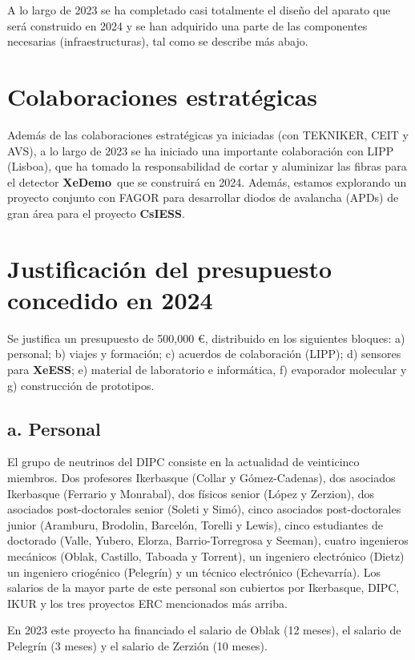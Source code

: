 \documentclass[12pt,a4paper,article]{report} %
\def\xess{{\bf XeESS}}
\def\cess{{\bf CsIESS}}
\def\xed{{\bf XeDemo}}
\begin{document}
A lo largo de 2023 se ha completado casi totalmente el diseño del aparato que será construido en 2024 y se han adquirido una parte de las componentes necesarias (infraestructuras), tal como se describe más abajo.  

\section*{Colaboraciones estratégicas}

Además de las colaboraciones estratégicas ya iniciadas (con TEKNIKER, CEIT y AVS), a lo largo de 2023 se ha iniciado una importante colaboración con LIPP (Lisboa), que ha tomado la responsabilidad de cortar y aluminizar las fibras para el detector \xed\ que se construirá en 2024. Además, estamos explorando un proyecto conjunto con FAGOR para  
desarrollar diodos de avalancha (APDs) de gran área para el proyecto \cess.  
 

\section*{Justificación del presupuesto concedido en 2024}

Se justifica un presupuesto de 500,000 \euro, distribuido en los siguientes bloques: a) personal; b) viajes y formación; c) acuerdos de colaboración (LIPP);  d) sensores para \xess; e) material de laboratorio e informática, f) evaporador molecular y g) construcción de prototipos. 

 \subsection*{a. Personal}
 
 El grupo de neutrinos del DIPC consiste en la actualidad de veinticinco miembros. Dos profesores Ikerbasque (Collar y Gómez-Cadenas), dos asociados Ikerbasque (Ferrario y Monrabal), dos físicos senior (López y Zerzion), dos asociados post-doctorales senior (Soleti y Simó), cinco asociados post-doctorales junior (Aramburu, Brodolin, Barcelón, Torelli y Lewis), cinco estudiantes de doctorado (Valle, Yubero, Elorza, Barrio-Torregrosa y Seeman), cuatro ingenieros mecánicos (Oblak, Castillo, Taboada y Torrent), un ingeniero electrónico (Dietz) un ingeniero criogénico (Pelegrín) y un técnico electrónico (Echevarría). Los salarios de la mayor parte de este personal son cubiertos por Ikerbasque, DIPC, IKUR y los tres proyectos ERC mencionados más arriba. 
 
 En 2023 este proyecto ha financiado el salario de  Oblak (12 meses), el salario de Pelegrín (3 meses) y el salario de Zerzión (10 meses). 
 
\end{document}
